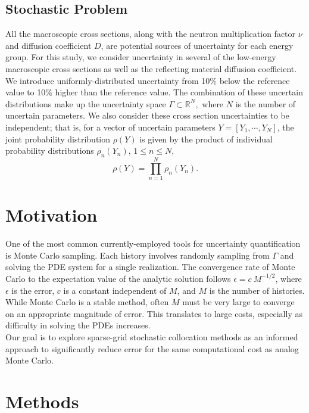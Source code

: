 \documentclass[11pt]{article}
\begin{document}
\subsection{Stochastic Problem}
All the macroscopic cross sections, along with the neutron multiplication factor $\nu$ and diffusion coefficient $D$, are potential sources of uncertainty for each energy group.  For this study, we consider uncertainty in several of the low-energy macroscopic cross sections as well as the reflecting material diffusion coefficient.  We introduce uniformly-distributed uncertainty from 10\% below the reference value to 10\% higher than the reference value.  The combination of these uncertain distributions make up the uncertainty space $\Gamma\subset\mathbb{R}^N,$ where $N$ is the number of uncertain parameters.  We also consider these cross section uncertainties to be independent; that is, for a vector of uncertain parameters $Y=[Y_1,\cdots,Y_N]$, the joint probability distribution $\rho(Y)$ is given by the product of individual probability distributions $\rho_n(Y_n)$, $1\leq n\leq N$,
\begin{equation}
\rho(Y) = \prod_{n=1}^N \rho_n(Y_n).
\end{equation}



\section{Motivation}
One of the most common currently-employed tools for uncertainty quantification is Monte Carlo sampling.  Each history involves randomly sampling from $\Gamma$ and solving the PDE system for a single realization.
The convergence rate of Monte Carlo to the expectation value of the analytic solution follows $\epsilon=c\ M^{-1/2}$, where $\epsilon$ is the error, $c$ is a constant independent of $M$, and $M$ is the number of histories.  While Monte Carlo is a stable method, often $M$ must be very large to converge on an appropriate magnitude of error.  This translates to large costs, especially as difficulty in solving the PDEs increases.\\

Our goal is to explore sparse-grid stochastic collocation methods as an informed approach to significantly reduce error for the same computational cost as analog Monte Carlo. 

\section{Methods}
\end{document}
